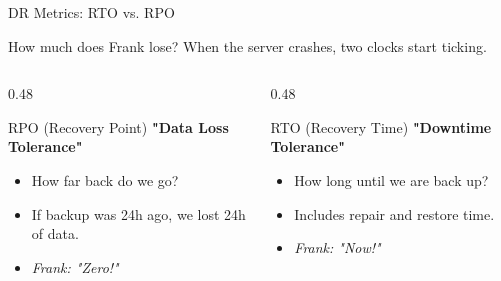 \documentclass[aspectratio=169]{beamer}  %
\begin{document}
\begin{frame}{DR Metrics: RTO vs. RPO}
    \begin{block}{How much does Frank lose?}
        \small
        When the server crashes, two clocks start ticking.
    \end{block}
    
    \begin{columns}[T]
        \begin{column}{0.48\textwidth}
            \begin{block}{RPO (Recovery Point)}
                \small
                \textbf{"Data Loss Tolerance"}
                \begin{itemize}
                    \item How far back do we go?
                    \item If backup was 24h ago, we lost 24h of data.
                    \item \textit{Frank: "Zero!"}
                \end{itemize}
            \end{block}
        \end{column}
        \begin{column}{0.48\textwidth}
            \begin{block}{RTO (Recovery Time)}
                \small
                \textbf{"Downtime Tolerance"}
                \begin{itemize}
                    \item How long until we are back up?
                    \item Includes repair and restore time.
                    \item \textit{Frank: "Now!"}
                \end{itemize}
            \end{block}
        \end{column}
    \end{columns}
    \begin{center}
    \end{center}
\end{frame}
\end{document}
